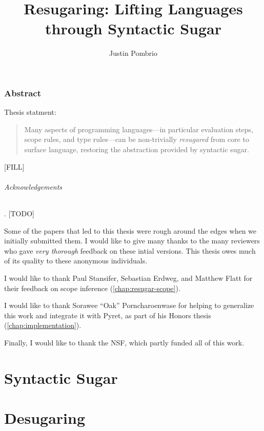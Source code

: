 \documentclass[
  10pt,
  paper=letter,
  footinclude=true,
  headinclude=true,
  american
]{scrbook}
\renewcommand{\<}{\le}
\begin{document}

\author{Justin Pombrio}
\title{Resugaring: Lifting Languages through Syntactic Sugar}
\maketitle


\section{Abstract}
  Thesis statment:
\begin{quote}
Many aspects of programming languages---in particular evaluation
steps, scope rules, and type rules---can be non-trivially
\emph{resugared} from core to surface language, restoring the
abstraction provided by syntactic sugar.
\end{quote}

[FILL]


\paragraph{Acknowledgements}. [TODO]

Some of the papers that led to this thesis were rough around the edges
when we initially submitted them. I would like to give many thanks to
the many reviewers who gave \emph{very thorough} feedback on these
intial versions. This thesis owes much of its quality to these
anonymous individuals.

I would like to thank Paul Stansifer, Sebastian Erdweg, and Matthew
Flatt for their feedback on scope inference
(\cref{chap:resugar-scope}).

I would like to thank Sorawee ``Oak'' Porncharoenwase for helping to
generalize this work and integrate it with Pyret, as part of his
Honors thesis (\cref{chap:implementation}).

Finally, I would like to thank the NSF, which partly funded all of this work.

\part{Syntactic Sugar}


\part{Desugaring}


\end{document}
